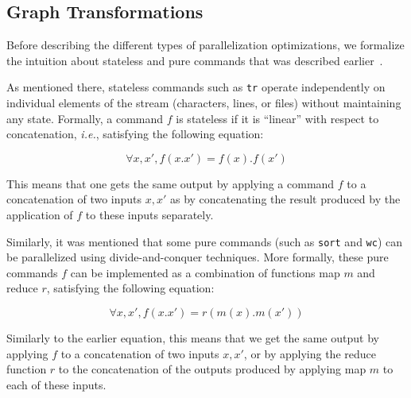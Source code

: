 \documentclass[sigplan,10pt,review,anonymous]{acmart}
\newcommand{\ie}{{\em i.e.}, }
\newcommand{\ttt}[1]{\texttt{\small #1}}
\newcommand{\nv}[1]{[{\color{cyan}#1 --- nv}]}
\begin{document}
\subsection{Graph Transformations}
\label{ir:transformations}

Before describing the different types of parallelization
optimizations, we formalize the intuition about stateless and pure
commands that was described earlier~.
%

As mentioned there, stateless commands such as \ttt{tr} operate independently on
individual elements of the stream (characters, lines, or files)
without maintaining any state.
Formally, a command $f$ is stateless if
it is ``linear'' with respect to concatenation, \ie 
satisfying the following equation:

\[
\forall x, x', f(x.x') = f(x).f(x')
\]


\noindent
This means that one gets the same output by applying a command $f$ to a
concatenation of two inputs $x, x'$ as by concatenating the result
produced by the application of $f$ to these inputs
separately.

Similarly, it was mentioned that some pure commands (such
as \ttt{sort} and \ttt{wc}) can be parallelized using
divide-and-conquer techniques. More formally, these pure commands $f$
can be implemented as a combination of functions map $m$ and reduce $r$, satisfying
the following equation:

\[
\forall x, x', f(x.x') = r(m(x).m(x'))
\]

\noindent
Similarly to the earlier equation, this means that we get the same output by
applying $f$ to a concatenation of two inputs $x, x'$, or by applying
the reduce function $r$ to the concatenation of the outputs produced
by applying map $m$ to each of these inputs.
\end{document}
